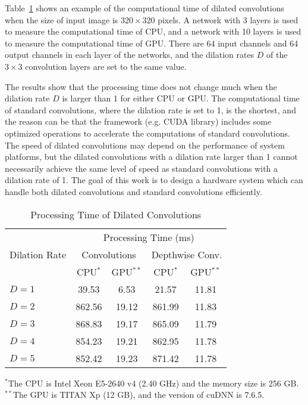 \documentclass[10pt,twocolumn,letterpaper]{article}
\begin{document}
Table~\ref{tab:time} shows an example of the computational time of dilated convolutions when the size of input image is $320 \times 320$ pixels. A network with 3 layers is used to measure the computational time of CPU, and a network with 10 layers is used to measure the computational time of GPU. There are 64 input channels and 64 output channels in each layer of the networks, and the dilation rates $D$ of the $3 \times 3$ convolution layers are set to the same value. 

The results show that the processing time does not change much when the dilation rate $D$ is larger than 1 for either CPU or GPU. The computational time of standard convolutions, where the dilation rate is set to 1, is the shortest, and the reason can be that the framework (e.g. CUDA library) includes some optimized operations to accelerate the computations of standard convolutions. The speed of dilated convolutions may depend on the performance of system platforms, but the dilated convolutions with a dilation rate larger than 1 cannot necessarily achieve the same level of speed as standard convolutions with a dilation rate of 1. The goal of this work is to design a hardware system which can handle both dilated convolutions and standard convolutions efficiently.

\begin{table}
\caption{Processing Time of Dilated Convolutions}
\begin{center}
\begin{tabular}{l|cc|cc}
\hline
\multirow{3}{*}{Dilation Rate} 
               & \multicolumn{4}{c}{Processing Time (ms)}\\
\cline{2-5}
               & \multicolumn{2}{c|}{Convolutions} & \multicolumn{2}{c}{Depthwise Conv.}\\ 
\cline{2-5}               
               & {CPU$^{*}$}  & GPU$^{**}$      & {CPU$^{*}$}  & GPU$^{**}$\\
              
\hline
$D = 1$ & 39.53  & 6.53  & 21.57  & 11.81\\
$D = 2$ & 862.56 & 19.12 & 861.99 & 11.83\\
$D = 3$ & 868.83 & 19.17 & 865.09 & 11.79\\
$D = 4$ & 854.23 & 19.21 & 862.95 & 11.78\\
$D = 5$ & 852.42 & 19.23 & 871.42 & 11.78\\
\hline
\end{tabular}
\end{center}
{\footnotesize
$^{*}$The CPU is Intel Xeon E5-2640 v4 (2.40 GHz) and the memory size is 256 GB.\\
$^{**}$The GPU is TITAN Xp (12 GB), and the version of cuDNN is 7.6.5.\\
}
\label{tab:time}
\end{table}
\end{document}
